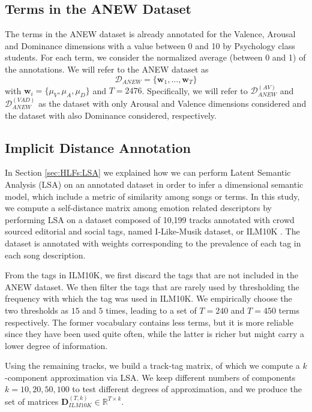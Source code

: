 \subsection{Terms in the ANEW Dataset}
The terms in the ANEW dataset \cite{Bradley1999} is already annotated for the Valence, Arousal and Dominance dimensions with a value between 0 and 10 by Psychology class students. For each term, we consider the normalized average (between 0 and 1) of the annotations. We will refer to the ANEW dataset as
\begin{equation}
\mathcal{D}_{ANEW}=\{\mathbf{w}_1, ..., \mathbf{w}_T\}
\label{eq:ANEW:ANEW}
\end{equation} 
with $\mathbf{w}_i=\{\mu_V, \mu_A, \mu_D \}$ and $T=2476$. Specifically, we will refer to $\mathcal{D}_{ANEW}^{(AV)}$ and $\mathcal{D}_{ANEW}^{(VAD)}$ as the dataset with only Arousal and Valence dimensions considered and the dataset with also Dominance considered, respectively. 

\subsection{Implicit Distance Annotation}
\label{sec:ANEW:ILM}
In Section \ref{sec:HLFs:LSA} we explained how we can perform  Latent Semantic Analysis (LSA) on an annotated dataset in order to infer a dimensional semantic model, which include a metric of similarity among songs or terms. In this study, we compute a self-distance matrix among emotion related descriptors by performing LSA on a dataset composed of 10,199 tracks annotated with crowd sourced editorial and social tags, named I-Like-Musik dataset, or ILM10K \cite{Saari2015, Allik2016}.
The dataset is annotated with weights corresponding to the prevalence of each tag in each song description. 

From the tags in ILM10K, we first discard the tags that are not included in the ANEW dataset. We then filter the tags that are rarely used by thresholding the frequency with which the tag  was used in ILM10K. We empirically choose the two thresholds as $15$ and $5$ times, leading to a set of $T=240$ and $T=450$ terms respectively. The former vocabulary contains less terms, but it is more reliable since they have been used quite often, while the latter is richer but might carry a lower degree of information. 

Using the remaining tracks, we build a track-tag matrix, of which we compute a $k$-component approximation via LSA. We keep different numbers of components $k=10, 20, 50, 100$ to test different degrees of approximation, and we produce the set of matrices $\mathbf{D}_{ILM10K}^{(T,k)} \in \mathbb{R}^{T \times k} $. 
 
